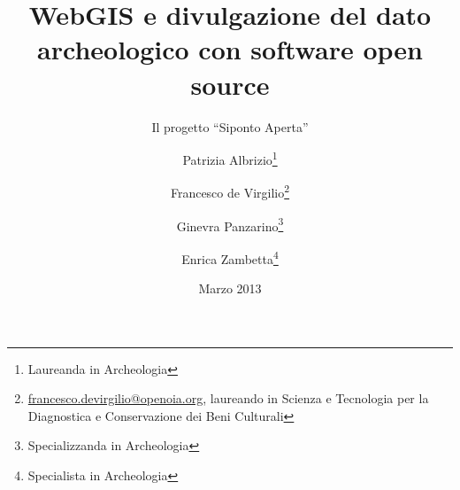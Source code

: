 \documentclass{paper}
\begin{document}

\renewcommand{\nameyeardelim}{, } %

\renewcommand{\bibleftparen}{}
\renewcommand{\bibrightparen}{}

\renewcommand*{\newunitpunct}{\addcomma\space}




\title{WebGIS e divulgazione del dato archeologico con software open source}

\subtitle{Il progetto ``Siponto Aperta''}

\author{
    \large{Patrizia Albrizio\thanks{Laureanda in Archeologia}}
    \and
    \large{Francesco de Virgilio\thanks{\protect\href{mailto:francesco.devirgilio@openoia.org}{francesco.devirgilio@openoia.org}, laureando in Scienza e Tecnologia per la Diagnostica e Conservazione dei Beni Culturali}}
    \and
    \large{Ginevra Panzarino\thanks{Specializzanda in Archeologia}}
    \and
    \large{Enrica Zambetta\thanks{Specialista in Archeologia}}
}


\date{Marzo 2013}
\maketitle
\end{document}
